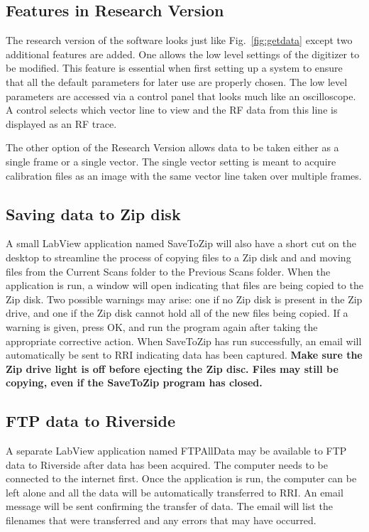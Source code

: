 \documentclass[10pt]{article}
\begin{document}
\subsection{Features in Research Version}

The research version of the software looks just like
Fig.~\ref{fig:getdata} except two additional features are added.
One allows the low level settings of the digitizer to be modified.
This feature is essential when first setting up a system to ensure
that all the default parameters for later use are properly chosen.
The low level parameters are accessed via a control panel that
looks much like an oscilloscope. A control selects which vector
line to view and the RF data from this line is displayed as an RF
trace.

The other option of the Research Version allows data to be taken
either as a single frame or a single vector. The single vector
setting is meant to acquire calibration files as an image with the
same vector line taken over multiple frames.

\subsection{Saving data to Zip disk}

A small LabView application named SaveToZip will also have a short
cut on the desktop to streamline the process of copying files to a
Zip disk and and moving files from the Current Scans folder to the
Previous Scans folder. When the application is run, a window will
open indicating that files are being copied to the Zip disk. Two
possible warnings may arise: one if no Zip disk is present in the
Zip drive, and one if the Zip disk cannot hold all of the new
files being copied. If a warning is given, press OK, and run the
program again after taking the appropriate corrective action. When
SaveToZip has run successfully, an email will automatically be
sent to RRI indicating data has been captured.
 {\bf Make sure the Zip drive light is off before ejecting the
Zip disc. Files may still be copying, even if the SaveToZip
program has closed.}

\subsection{FTP data to Riverside}

A separate LabView application named FTPAllData may be available
to FTP data to Riverside after data has been acquired. The
computer needs to be connected to the internet first. Once the
application is run, the computer can be left alone and all the
data will be automatically transferred to RRI. An email message
will be sent confirming the transfer of data. The email will list
the filenames that were transferred and any errors that may have
occurred.
\end{document}
